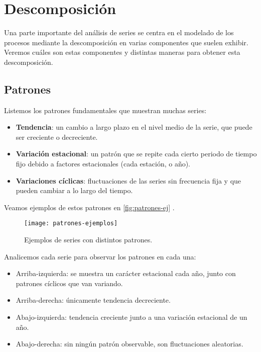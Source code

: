 \section{Descomposición}

Una parte importante del análisis de series se centra en el modelado de los procesos mediante la descomposición en varias componentes que suelen exhibir. Veremos cuáles son estas componentes y distintas maneras para obtener esta descomposición.

\subsection{Patrones}

Listemos los patrones fundamentales que muestran muchas series:

\begin{itemize}
  \item \textbf{Tendencia}: un cambio a largo plazo en el nivel medio de la serie, que puede ser creciente o decreciente.
  \item \textbf{Variación estacional}: un patrón que se repite cada cierto periodo de tiempo fijo debido a factores estacionales (cada estación, o año).
  \item \textbf{Variaciones cíclicas}: fluctuaciones de las series sin frecuencia fija y que pueden cambiar a lo largo del tiempo.
\end{itemize}

Veamos ejemplos de estos patrones en \autoref{fig:patrones-ej} \cite{hyndman2018forecasting}.

\begin{figure}[htpb]
  \centering
  \texttt{[image: patrones-ejemplos]}
  \caption{Ejemplos de series con distintos patrones.}
  \label{fig:patrones-ej}
\end{figure}

Analicemos cada serie para observar los patrones en cada una:

\begin{itemize}
  \item Arriba-izquierda: se muestra un carácter estacional cada año, junto con patrones cíclicos que van variando.
  \item Arriba-derecha: únicamente tendencia decreciente.
  \item Abajo-izquierda: tendencia creciente junto a una variación estacional de un año.
  \item Abajo-derecha: sin ningún patrón observable, son fluctuaciones aleatorias.
\end{itemize}

